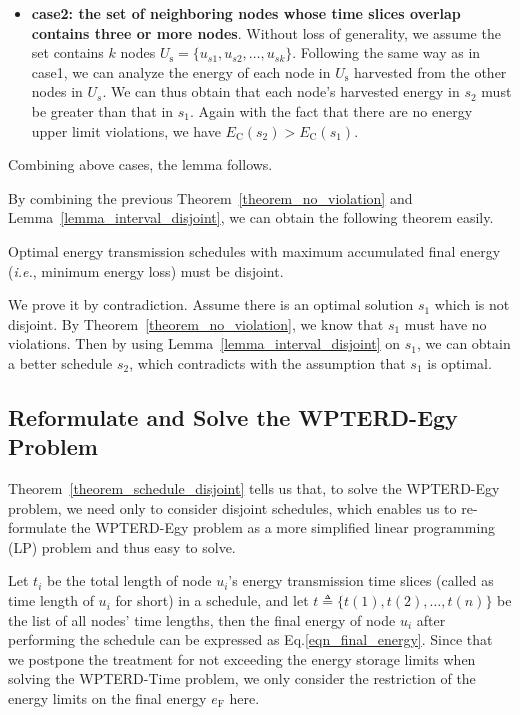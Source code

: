 \documentclass[journal,10pt]{IEEEtran}
\begin{document}
\begin{IEEEproof}
\begin{itemize}
\item{\textbf{case2: the set of neighboring nodes whose time slices overlap contains three or more nodes}}.
Without loss of generality, we assume the set contains $k$ nodes $U_\text{s}{=}\{u_{s1},u_{s2},\ldots,u_{sk}\}$. Following the same way as in case1, we can analyze the energy of each node in $U_\text{s}$ harvested from the other nodes in $U_s$. We can thus obtain that each node's harvested energy in $s_2$ must be greater than that in $s_1$. Again with the fact that there are no energy upper limit violations, we have $E_\text{C}(s_2){>}E_\text{C}(s_1)$.

\end{itemize}

Combining above cases, the lemma follows.
\end{IEEEproof}

By combining the previous Theorem~\ref{theorem_no_violation} and Lemma~\ref{lemma_interval_disjoint}, we can obtain the following theorem easily.

\begin{theorem}
\label{theorem_schedule_disjoint}
Optimal energy transmission schedules with maximum accumulated final energy (\textit{i.e.}, minimum energy loss) must be disjoint.
\end{theorem}

\begin{IEEEproof}
We prove it by contradiction. Assume there is an optimal solution $s_1$ which is not disjoint. By Theorem~\ref{theorem_no_violation}, we know that $s_1$ must have no violations. Then by using Lemma~\ref{lemma_interval_disjoint} on $s_1$, we can obtain a better schedule $s_2$, which contradicts with the assumption that $s_1$ is optimal.
\end{IEEEproof}

\subsection{Reformulate and Solve the WPTERD-Egy Problem}

Theorem~\ref{theorem_schedule_disjoint} tells us that, to solve the WPTERD-Egy problem, we need only to consider disjoint schedules, which enables us to re-formulate the WPTERD-Egy problem as a more simplified linear programming (LP) problem and thus easy to solve.

Let $t_i$ be the total length of node $u_i$'s energy transmission time slices (called as time length of $u_i$ for short) in a schedule, and let $t{\triangleq}\{t(1),t(2),\ldots,t(n)\}$ be the list of all nodes' time lengths, then the final energy of node $u_i$ after performing the schedule can be expressed as Eq.\eqref{eqn_final_energy}. Since that we postpone the treatment for not exceeding the energy storage limits when solving the WPTERD-Time problem, we only consider the restriction of the energy limits on the final energy $e_\text{F}$ here.
\end{document}

